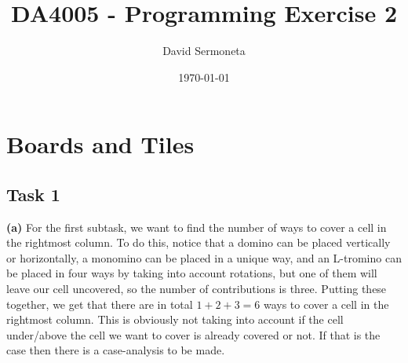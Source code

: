 \documentclass[11pt,a4paper]{article}
\title{DA4005 - Programming Exercise 2}
\author{David Sermoneta}
\date{\today}
\begin{document}
\maketitle
\section*{Boards and Tiles}
\subsection*{Task 1}
\textbf{(a)} For the first subtask, we want to find the number of ways to cover a cell in
the rightmost column. To do this, notice that a domino can be placed vertically
or horizontally, a monomino can be placed in a unique way, and an L-tromino can
be placed in four ways by taking into account rotations, but one of them will
leave our cell uncovered, so the number of contributions is three. Putting
these together, we get that there are in total $1 + 2 + 3 = 6$ ways to cover a
cell in the rightmost column. This is obviously not taking into account if the cell under/above the cell we want to cover is already covered or not. If that is the case then there is a case-analysis to be made.
\end{document}
